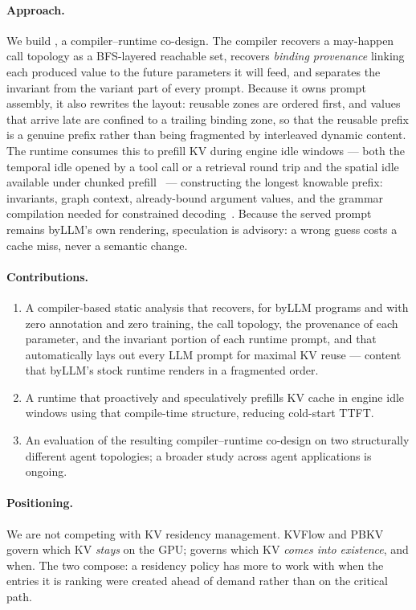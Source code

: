 \paragraph{Approach.} We build \sysname{}, a compiler--runtime co-design. The
compiler recovers a may-happen call topology as a BFS-layered reachable set,
recovers \emph{binding provenance} linking each produced value to the future
parameters it will feed, and separates the invariant from the variant part of
every prompt. Because it owns prompt assembly, it also rewrites the layout:
reusable zones are ordered first, and values that arrive late are confined to a
trailing binding zone, so that the reusable prefix is a genuine prefix rather
than being fragmented by interleaved dynamic content. The runtime consumes this
to prefill KV during engine idle windows --- both the temporal idle opened by a
tool call or a retrieval round trip and the spatial idle available under chunked
prefill~\cite{agrawal2024sarathi} --- constructing the longest knowable prefix:
invariants, graph context, already-bound argument values, and the grammar
compilation needed for constrained decoding~\cite{dong2025xgrammar}. Because the
served prompt remains byLLM's own rendering, speculation is advisory: a wrong
guess costs a cache miss, never a semantic change.

\paragraph{Contributions.}
\begin{enumerate}\itemsep2pt
\item A compiler-based static analysis that recovers, for byLLM programs and
      with zero annotation and zero training, the call topology, the provenance
      of each parameter, and the invariant portion of each runtime prompt, and
      that automatically lays out every LLM prompt for maximal KV reuse ---
      content that byLLM's stock runtime renders in a fragmented order.
\item A runtime that proactively and speculatively prefills KV cache in engine
      idle windows using that compile-time structure, reducing cold-start TTFT.
\item An evaluation of the resulting compiler--runtime co-design on two
      structurally different agent topologies; a broader study across agent
      applications is ongoing.
\end{enumerate}

\paragraph{Positioning.} We are not competing with KV residency management. KVFlow
and PBKV govern which KV \emph{stays} on the GPU; \sysname{} governs which KV
\emph{comes into existence}, and when. The two compose: a residency policy has
more to work with when the entries it is ranking were created ahead of demand
rather than on the critical path.
